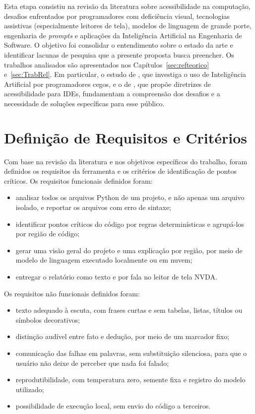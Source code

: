\documentclass[
    12pt,                   %
    openright,              %
    oneside,                %
    a4paper,                %
    sumario=tradicional,    %
    english,                %
    brazil,                 %
    ]{abntex2}
\begin{document}
Esta etapa consistiu na revisão da literatura sobre acessibilidade na computação, desafios enfrentados por programadores com deficiência visual, tecnologias assistivas (especialmente leitores de tela), modelos de linguagem de grande porte, engenharia de \textit{prompts} e aplicações da Inteligência Artificial na Engenharia de Software. O objetivo foi consolidar o entendimento sobre o estado da arte e identificar lacunas de pesquisa que a presente proposta busca preencher. Os trabalhos analisados são apresentados nos Capítulos~\ref{sec:refteorico} e~\ref{sec:TrabRel}. Em particular, o estudo de \textcite{latinoware34224}, que investiga o uso de Inteligência Artificial por programadores cegos, e o de \textcite{latinoware37693}, que propõe diretrizes de acessibilidade para IDEs, fundamentam a compreensão dos desafios e a necessidade de soluções específicas para esse público.

\section{Definição de Requisitos e Critérios}\label{sec:requisitos}

Com base na revisão da literatura e nos objetivos específicos do trabalho, foram definidos os requisitos da ferramenta e os critérios de identificação de pontos críticos. Os requisitos funcionais definidos foram:

\begin{itemize}
  \item analisar todos os arquivos Python de um projeto, e não apenas um arquivo isolado, e reportar os arquivos com erro de sintaxe;
  \item identificar pontos críticos do código por regras determinísticas e agrupá-los por região de código;
  \item gerar uma visão geral do projeto e uma explicação por região, por meio de modelo de linguagem executado localmente ou em nuvem;
  \item entregar o relatório como texto e por fala no leitor de tela NVDA.
\end{itemize}

Os requisitos não funcionais definidos foram:

\begin{itemize}
  \item texto adequado à escuta, com frases curtas e sem tabelas, listas, títulos ou símbolos decorativos;
  \item distinção audível entre fato e dedução, por meio de um marcador fixo;
  \item comunicação das falhas em palavras, sem substituição silenciosa, para que o usuário não deixe de perceber que nada foi falado;
  \item reprodutibilidade, com temperatura zero, semente fixa e registro do modelo utilizado;
  \item possibilidade de execução local, sem envio do código a terceiros.
\end{itemize}
\end{document}
